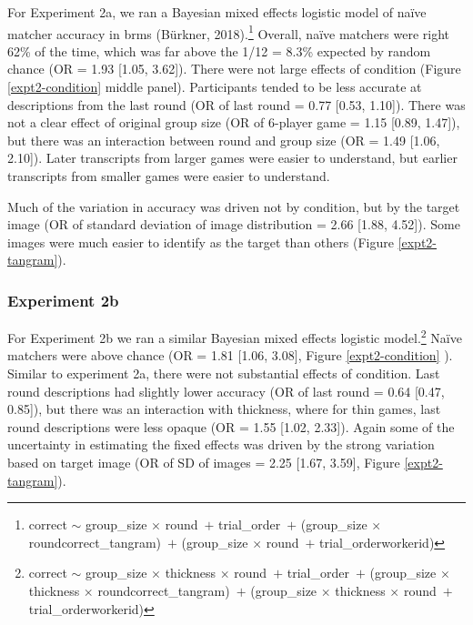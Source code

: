 \documentclass[10pt, letterpaper]{article}
\begin{document}
For Experiment 2a, we ran a Bayesian mixed effects logistic model of
naïve matcher accuracy in brms (Bürkner, 2018).\footnote{correct
  \({\sim}\) group\_size \({\times}\) round~\({+}\) trial\_order~\({+}\)
  (group\_size \({\times}\) round\textbar correct\_tangram)~\({+}\)
  (group\_size \({\times}\) round~\({+}\) trial\_order\textbar workerid)}
Overall, naïve matchers were right 62\% of the time, which was far above
the 1/12 = 8.3\% expected by random chance (OR = 1.93 {[}1.05, 3.62{]}).
There were not large effects of condition (Figure \ref{expt2-condition}
middle panel). Participants tended to be less accurate at descriptions
from the last round (OR of last round = 0.77 {[}0.53, 1.10{]}). There
was not a clear effect of original group size (OR of 6-player game =
1.15 {[}0.89, 1.47{]}), but there was an interaction between round and
group size (OR = 1.49 {[}1.06, 2.10{]}). Later transcripts from larger
games were easier to understand, but earlier transcripts from smaller
games were easier to understand.

Much of the variation in accuracy was driven not by condition, but by
the target image (OR of standard deviation of image distribution = 2.66
{[}1.88, 4.52{]}). Some images were much easier to identify as the
target than others (Figure \ref{expt2-tangram}).

\subsubsection{Experiment 2b}\label{experiment-2b-1}

For Experiment 2b we ran a similar Bayesian mixed effects logistic
model.\footnote{correct \({\sim}\) group\_size \({\times}\) thickness
  \({\times}\) round~\({+}\) trial\_order~\({+}\) (group\_size
  \({\times}\) thickness \({\times}\)
  round\textbar correct\_tangram)~\({+}\) (group\_size \({\times}\)
  thickness \({\times}\) round~\({+}\) trial\_order\textbar workerid)}
Naïve matchers were above chance (OR = 1.81 {[}1.06, 3.08{]}, Figure
\ref{expt2-condition} ). Similar to experiment 2a, there were not
substantial effects of condition. Last round descriptions had slightly
lower accuracy (OR of last round = 0.64 {[}0.47, 0.85{]}), but there was
an interaction with thickness, where for thin games, last round
descriptions were less opaque (OR = 1.55 {[}1.02, 2.33{]}). Again some
of the uncertainty in estimating the fixed effects was driven by the
strong variation based on target image (OR of SD of images = 2.25
{[}1.67, 3.59{]}, Figure \ref{expt2-tangram}).
\end{document}
